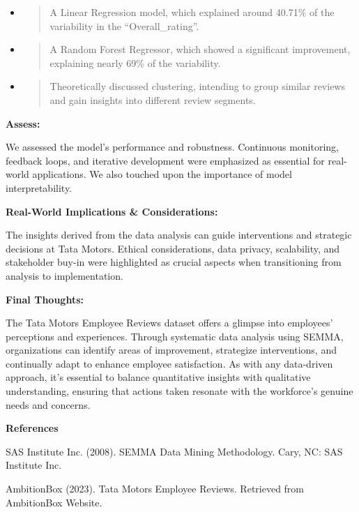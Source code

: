 \documentclass[
]{article}
\newcommand{\textcenter}[1]{\begin{center} \vspace{10px}\textbf{\large #1} \end{center}}
\begin{document}
\begin{itemize}
\item
  \begin{quote}
  A Linear Regression model, which explained around 40.71\% of the
  variability in the ``Overall\_rating''.
  \end{quote}
\item
  \begin{quote}
  A Random Forest Regressor, which showed a significant improvement,
  explaining nearly 69\% of the variability.
  \end{quote}
\item
  \begin{quote}
  Theoretically discussed clustering, intending to group similar reviews
  and gain insights into different review segments.
  \end{quote}
\end{itemize}

\textbf{Assess:}

We assessed the model's performance and robustness. Continuous
monitoring, feedback loops, and iterative development were emphasized as
essential for real-world applications. We also touched upon the
importance of model interpretability.

\textbf{Real-World Implications \& Considerations:}

The insights derived from the data analysis can guide interventions and
strategic decisions at Tata Motors. Ethical considerations, data
privacy, scalability, and stakeholder buy-in were highlighted as crucial
aspects when transitioning from analysis to implementation.


\textcenter{Final Thoughts:}

The Tata Motors Employee Reviews dataset offers a glimpse into
employees' perceptions and experiences. Through systematic data analysis
using SEMMA, organizations can identify areas of improvement, strategize
interventions, and continually adapt to enhance employee satisfaction.
As with any data-driven approach, it's essential to balance quantitative
insights with qualitative understanding, ensuring that actions taken
resonate with the workforce's genuine needs and concerns.

\textcenter{References}

SAS Institute Inc. (2008). SEMMA Data Mining Methodology. Cary, NC: SAS
Institute Inc.

AmbitionBox (2023). Tata Motors Employee Reviews. Retrieved from
AmbitionBox Website.
\end{document}
